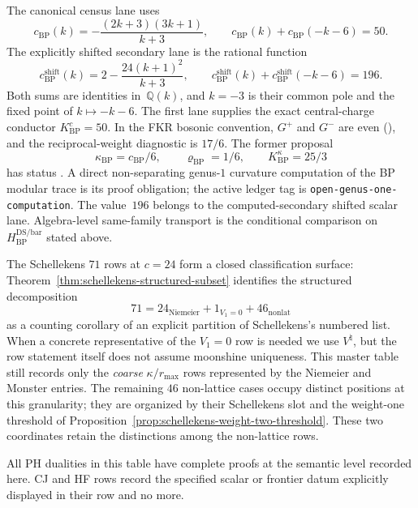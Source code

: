\begin{remark}
\label{rem:bp-census-convention-separation}
The canonical census lane uses
\[
c_{\mathrm{BP}}(k)
=-\frac{(2k+3)(3k+1)}{k+3},
\qquad
c_{\mathrm{BP}}(k)+c_{\mathrm{BP}}(-k-6)=50.
\]
The explicitly shifted secondary lane is the rational function
\[
c_{\mathrm{BP}}^{\mathrm{shift}}(k)
=2-\frac{24(k+1)^2}{k+3},
\qquad
c_{\mathrm{BP}}^{\mathrm{shift}}(k)
+c_{\mathrm{BP}}^{\mathrm{shift}}(-k-6)=196.
\]
Both sums are identities in~$\mathbb Q(k)$, and $k=-3$ is their common
pole and the fixed point of $k\mapsto-k-6$.  The first lane supplies the
exact central-charge conductor $K^c_{\mathrm{BP}}=50$.  In the FKR
bosonic convention, $G^+$ and $G^-$ are even
\textup{(}\cite[\S2.1]{FKR20}\textup{)}, and the reciprocal-weight
diagnostic is $17/6$.  The former proposal
\[
 \kappa_{\mathrm{BP}}=c_{\mathrm{BP}}/6,
 \qquad
 \varrho_{\mathrm{BP}}=1/6,
 \qquad
 K^\kappa_{\mathrm{BP}}=25/3
\]
has status \ClaimStatusConjectured.  A direct non-separating genus-$1$
curvature computation of the BP modular trace is its proof obligation;
the active ledger tag is \texttt{open-genus-one-computation}.
The value~$196$ belongs to the computed-secondary shifted scalar lane.
Algebra-level same-family transport is the conditional comparison on
$H_{\mathrm{BP}}^{\mathrm{DS/bar}}$ stated above.
\end{remark}

\noindent The Schellekens $71$ rows at $c = 24$ form a closed
classification surface:
Theorem~\ref{thm:schellekens-structured-subset} identifies the
structured decomposition
\[
71 = 24_{\mathrm{Niemeier}} + 1_{V_1=0} + 46_{\mathrm{nonlat}}
\]
as a counting corollary of an explicit partition of Schellekens's
numbered list. When a concrete representative of the $V_1=0$ row is
needed we use $V^\natural$, but the row statement itself does not
assume moonshine uniqueness.
This master table still records only the \emph{coarse} $\kappa/r_{\max}$
rows represented by the Niemeier and Monster entries.  The remaining
$46$ non-lattice cases occupy distinct positions at this granularity;
they are organized by their Schellekens slot and
the weight-one threshold of
Proposition~\ref{prop:schellekens-weight-two-threshold}.  These two
coordinates retain the distinctions among the non-lattice rows.

\medskip

All PH dualities in this table have complete proofs at the semantic
level recorded here. CJ and HF rows record the specified scalar or
frontier datum explicitly displayed in their row and no more.

